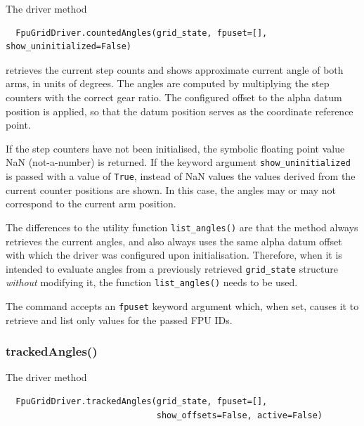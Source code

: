 \documentclass[11pt,a4paper]{scrartcl}
\begin{document}
The driver method

\begin{verbatim}
  FpuGridDriver.countedAngles(grid_state, fpuset=[], show_uninitialized=False)
\end{verbatim}
retrieves the current step counts and shows approximate current angle
of both arms, in units of degrees. The angles are computed by
multiplying the step counters with the correct gear ratio. The
configured offset to the alpha datum position is applied, so that the
datum position serves as the coordinate reference point.

If the step counters have not been initialised, the symbolic floating
point value NaN (not-a-number) is returned.  If the keyword argument
\texttt{show\_uninitialized} is passed with a value of \texttt{True},
instead of NaN values the values derived from the current counter
positions are shown. In this case, the angles may or may not
correspond to the current arm position.

The differences to the utility function \texttt{list\_angles()} are
that the method always retrieves the current angles, and also always
uses the same alpha datum offset with which the driver was configured
upon initialisation. Therefore, when it is intended to evaluate angles
from a previously retrieved \texttt{grid\_state} structure
\emph{without} modifying it, the function \texttt{list\_angles()}
needs to be used.

The command accepts an \texttt{fpuset} keyword argument which, when
set, causes it to retrieve and list only values for the passed FPU
IDs.


\subsubsection{trackedAngles()}
\label{sec:trackedangles}

The driver method

\begin{verbatim}
  FpuGridDriver.trackedAngles(grid_state, fpuset=[],
                              show_offsets=False, active=False)
\end{verbatim}
\end{document}
